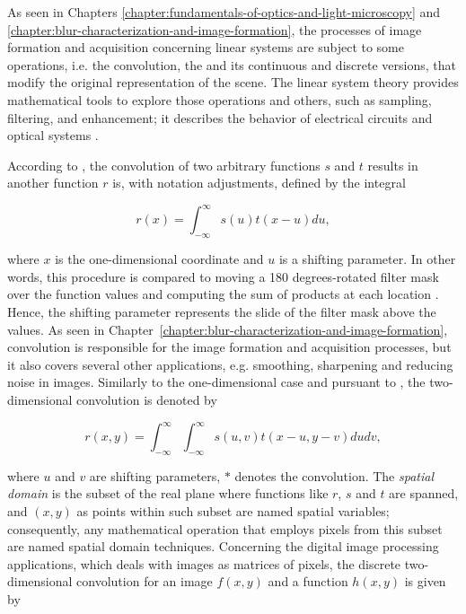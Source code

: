 As seen in Chapters \ref{chapter:fundamentals-of-optics-and-light-microscopy} and \ref{chapter:blur-characterization-and-image-formation}, the processes of image formation and acquisition concerning linear systems are subject to some operations, i.e. the convolution, the  and its continuous and discrete versions, that modify the original representation of the scene. The linear system theory provides mathematical tools to explore those operations and others, such as sampling, filtering, and enhancement; it describes the behavior of electrical circuits and optical systems \cite{castleman1996digital}.

According to , the convolution of two arbitrary functions $s$ and $t$ results in another function $r$ is, with notation adjustments, defined by the integral

\begin{equation}
\label{eqn:one_dimensional_convolution}
r(x) = \int_{-\infty}^{\infty}s(u) t(x - u) du,
\end{equation}

\noindent where $x$ is the one-dimensional coordinate and $u$ is a shifting parameter. In other words, this procedure is compared to moving a 180 degrees-rotated filter mask over the function values and computing the sum of products at each location \cite{gonzalez2018digital}. Hence, the shifting parameter represents the slide of the filter mask above the values. As seen in Chapter~\ref{chapter:blur-characterization-and-image-formation}, convolution is responsible for the image formation and acquisition processes, but it also covers several other applications, e.g. smoothing, sharpening and reducing noise in images. Similarly to the one-dimensional case and pursuant to , the two-dimensional convolution is denoted by

\begin{equation}
\label{eqn:two_dimensional_convolution}
r(x,y) = \int_{-\infty}^{\infty}
         \int_{-\infty}^{\infty}
         s(u,v) t(x - u, y - v) du dv,
\end{equation}

\noindent where $u$ and $v$ are shifting parameters, $\ast$ denotes the convolution. The \emph{spatial domain} is the subset of the real plane where functions like $r$, $s$ and $t$ are spanned, and $(x,y)$ as points within such subset are named spatial variables; consequently, any mathematical operation that employs pixels from this subset are named spatial domain techniques. Concerning the digital image processing applications, which deals with images as matrices of pixels, the discrete two-dimensional convolution for an image $f(x,y)$ and a function $h(x,y)$ is given by 

